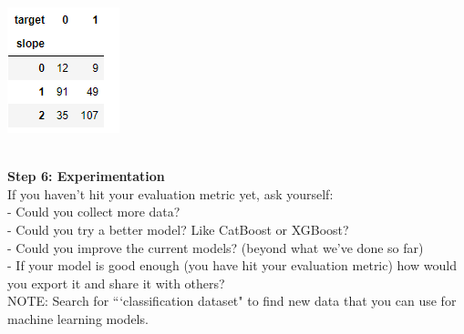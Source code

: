 \documentclass[11pt, a4paper]{article}
\begin{document}
\begin{spacing}{1.1}
\begin{minipage}[c]{8cm}
	\includegraphics[scale=.8]{crosstab2_mp}
	\end{minipage} \vspace*{7mm} \\
	\textbf{Step 6: Experimentation} \\
	If you haven't hit your evaluation metric yet, ask yourself: \vspace*{1mm} \\	
	\hspace*{2mm} - Could you collect more data? \\
	\hspace*{2mm} - Could you try a better model? Like CatBoost or XGBoost? \\
	\hspace*{2mm} - Could you improve the current models? (beyond what we've done so far) \\
	\hspace*{2mm} - If your model is good enough (you have hit your evaluation metric) how would you export it and \hspace*{5mm} share it with others? \vspace*{3mm} \\
	NOTE: Search for ```classification dataset" to find new data that you can use for machine learning models. \newpage


\end{spacing}
\end{document}

